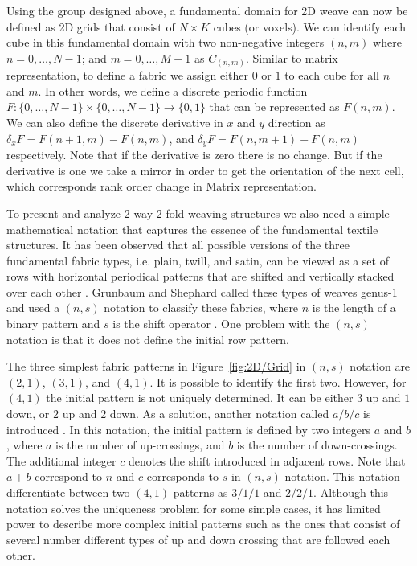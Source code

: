\documentclass[times,twocolumn,final]{elsarticle}
\begin{document}
Using the group designed above, a fundamental domain for 2D weave can now be defined as 2D grids that consist of $N \times K$ cubes (or voxels). We can identify each cube in this fundamental domain with two non-negative integers $(n,m)$ where $n=0,\ldots, N-1$; and $m=0,\ldots, M-1$ as $C_{(n,m)}$. Similar to matrix representation, to define a fabric we assign either $0$ or $1$ to each cube for all $n$ and $m$. In other words, we define a discrete periodic function $F: \{0,\ldots,N-1\} \times \{0,\ldots,N-1\} \rightarrow \{0,1\}$ that can be represented as $F(n,m)$. We can also define the discrete derivative in $x$ and $y$ direction as $\delta_x F = F(n+1,m)-F(n,m)$, and $\delta_y F = F(n,m+1)-F(n,m)$ respectively. Note that if the derivative is zero there is no change. But if the derivative is one we take a mirror in order to get the orientation of the next cell, which corresponds rank order change in Matrix representation. 

To present and analyze 2-way 2-fold weaving structures we also need a simple mathematical notation that captures the essence of the fundamental textile structures. It has been observed that all possible versions of the three fundamental fabric types, i.e. plain, twill, and satin, can be viewed as a set of rows with horizontal periodical patterns that are shifted and vertically stacked over each other \cite{chen2010designing}. Grunbaum and Shephard called these types of weaves genus-1 and used a $(n,s)$ notation  to classify these fabrics, where $n$ is the length of a binary pattern and $s$ is the shift operator \cite{Grunbaum80}. One problem with  the $(n, s)$ notation is that it does not define the initial row pattern. 

The three simplest fabric patterns in Figure~\ref{fig:2D/Grid} in $(n,s)$ notation are $(2,1)$, $(3,1)$, and $(4,1)$. It is possible to identify the first two. However, for $(4,1)$ the initial pattern is not uniquely determined. It can be either $3$ up and $1$ down, or $2$ up and $2$ down. As a solution, another notation called  $a/b/c$ is introduced \cite{chen2010designing}. In this notation, the initial pattern is defined by two integers $a$ and $b$, where $a$ is the number of up-crossings, and $b$ is the number of down-crossings. The additional integer $c$ denotes the shift introduced in adjacent rows. Note that $a+b$ correspond to $n$ and $c$ corresponds to $s$ in $(n, s)$ notation. This notation differentiate between two $(4,1)$ patterns as $3/1/1$ and $2/2/1$. Although this notation solves the uniqueness problem for some simple cases, it has limited power to describe more complex initial patterns such as the ones that consist of several number different types of up and down crossing that are followed each other. 
\end{document}
